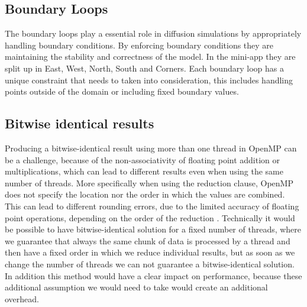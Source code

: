 \subsection{Boundary Loops}
The boundary loops play a essential role in diffusion simulations by appropriately handling boundary conditions. By enforcing boundary conditions they are maintaining the stability and correctness of the model. In the mini-app they are split up in East, West, North, South and Corners. Each boundary loop has a unique constraint that needs to taken into consideration, this includes handling points outside of the domain or including fixed boundary values.



\subsection{Bitwise identical results}
Producing a bitwise-identical result using more than one thread in OpenMP can be a challenge, because of the non-associativity of floating point addition or multiplications, which can lead to different results even when using the same number of threads. More specifically when using the reduction clause, OpenMP does not specify the location nor the order in which the values are combined. This can lead to different rounding errors, due to the limited accuracy of floating point operations, depending on the order of the reduction \cite{noauthor_reduction_nodate}. Technically it would be possible to have bitwise-identical solution for a fixed number of threads, where we guarantee that always the same chunk of data is processed by a thread and then have a fixed order in which we reduce individual results, but as soon as we change the number of threads we can not guarantee a bitwise-identical solution. In addition this method would have a clear impact on performance, because these additional assumption we would need to take would create an additional overhead.

